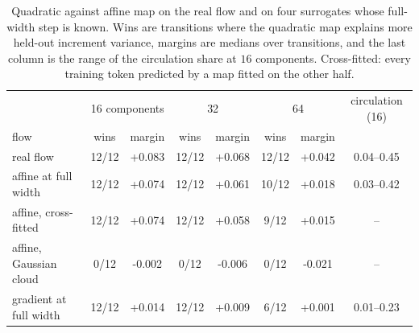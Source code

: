 \begin{table}[t]
\centering
\caption{Quadratic against affine map on the real flow and on four surrogates whose full-width step is known. Wins are transitions where the quadratic map explains more held-out increment variance, margins are medians over transitions, and the last column is the range of the circulation share at $16$ components. Cross-fitted: every training token predicted by a map fitted on the other half.}
\label{tab:projection}
\small
\setlength{\tabcolsep}{4pt}
\begin{tabular}{lcccccc c}
\toprule
& \multicolumn{2}{c}{16 components} & \multicolumn{2}{c}{32} & \multicolumn{2}{c}{64} & circulation (16) \\
flow & wins & margin & wins & margin & wins & margin & \\
\midrule
real flow & 12/12 & +0.083 & 12/12 & +0.068 & 12/12 & +0.042 & 0.04--0.45 \\
affine at full width & 12/12 & +0.074 & 12/12 & +0.061 & 10/12 & +0.018 & 0.03--0.42 \\
affine, cross-fitted & 12/12 & +0.074 & 12/12 & +0.058 & 9/12 & +0.015 & -- \\
affine, Gaussian cloud & 0/12 & -0.002 & 0/12 & -0.006 & 0/12 & -0.021 & -- \\
gradient at full width & 12/12 & +0.014 & 12/12 & +0.009 & 6/12 & +0.001 & 0.01--0.23 \\
\bottomrule
\end{tabular}
\end{table}
